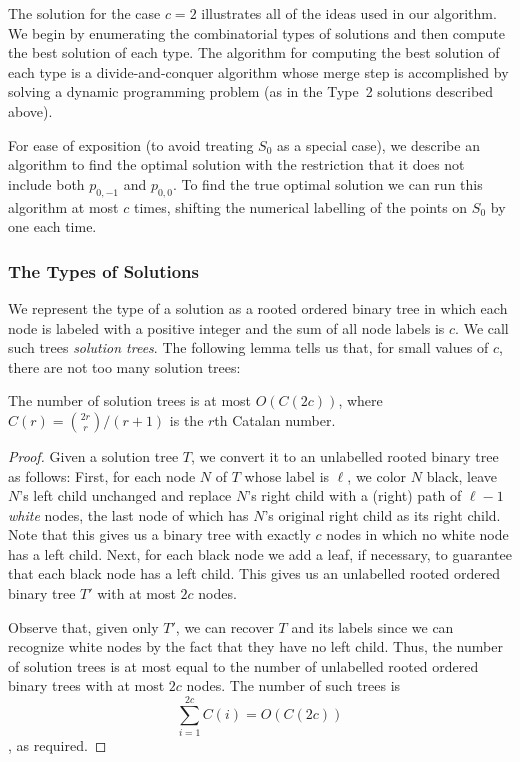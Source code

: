 \documentclass[lotsofwhite]{patmorin}
\begin{document}
The solution for the case $c=2$ illustrates all of the ideas used in 
our algorithm.  We begin by enumerating the combinatorial types of
solutions and then compute the best solution of each type.  The
algorithm for computing the best solution of each type is a
divide-and-conquer algorithm whose merge step is accomplished by
solving a dynamic programming problem (as in the Type~2 solutions
described above).

For ease of exposition (to avoid treating $S_0$ as a special case), we
describe an algorithm to find the optimal solution with the
restriction that it does not include both $p_{0,-1}$ and $p_{0,0}$.
To find the true optimal solution we can run this algorithm at most
$c$ times, shifting the numerical labelling of the points on $S_0$ by
one each time.

\subsubsection{The Types of Solutions}

We represent the type of a solution as a rooted ordered binary tree in
which each node is labeled with a positive integer and the sum of all
node labels is $c$.  We call such trees \emph{solution trees}.  The
following lemma tells us that, for small values of $c$, there are not
too many solution trees:
 
\begin{lem}
The number of solution trees is at most $O(C(2c))$, where
$C(r)={2r\choose r}/(r+1)$ is the $r$th Catalan number.
\end{lem}

\begin{proof} Given a solution tree $T$, we convert it to an
unlabelled rooted binary tree as follows: First, for each node $N$ of
$T$ whose label is $\ell$, we color $N$ black, leave $N$'s left child
unchanged and replace $N$'s right child with a (right) path of
$\ell-1$ \emph{white} nodes, the last node of which has $N$'s original
right child as its right child.  Note that this gives us a binary
tree with exactly $c$ nodes in which no white node has a left child.
Next, for each black node we add a leaf, if necessary, to guarantee
that each black node has a left child.  This gives us an unlabelled
rooted ordered binary tree $T'$ with at most $2c$ nodes.

Observe that, given only $T'$, we can recover $T$ and its labels since
we can recognize white nodes by the fact that they have no left child.
Thus, the number of solution trees is at most equal to the number of
unlabelled rooted ordered binary trees with at most $2c$ nodes.  The
number of such trees is 
\[
  \sum_{i=1}^{2c} C(i) = O(C(2c))
\]
\cite{knuth-graham-patashnik},
as required.
\end{proof}
\end{document}
